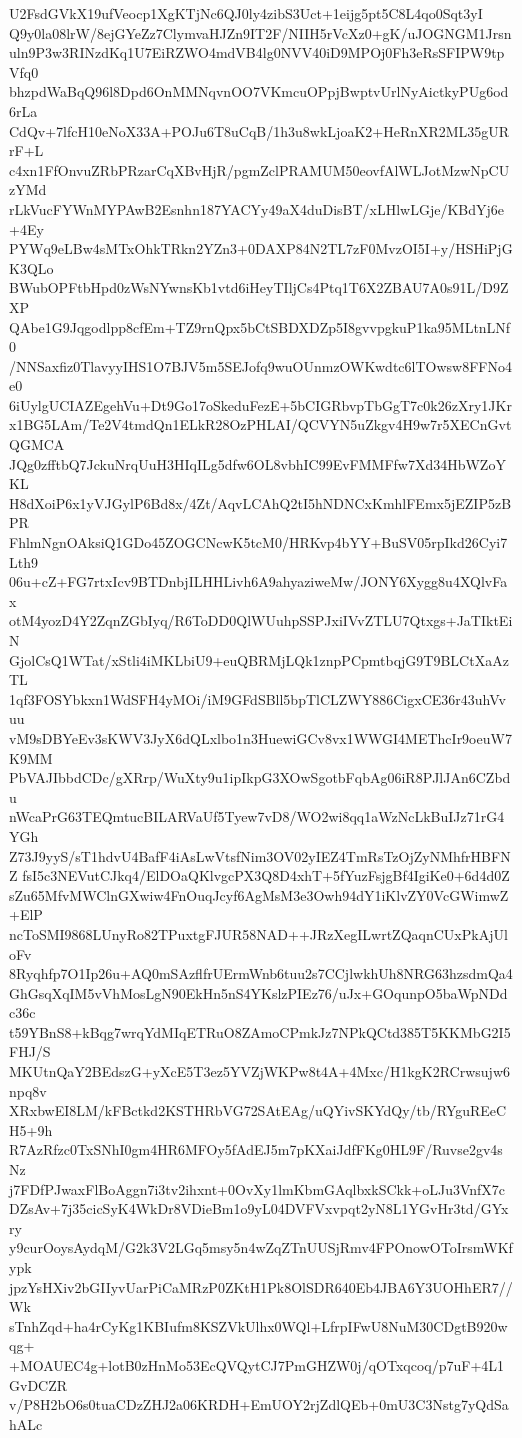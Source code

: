 U2FsdGVkX19ufVeocp1XgKTjNc6QJ0ly4zibS3Uct+1eijg5pt5C8L4qo0Sqt3yI
Q9y0la08lrW/8ejGYeZz7ClymvaHJZn9IT2F/NIIH5rVcXz0+gK/uJOGNGM1Jrsn
uln9P3w3RINzdKq1U7EiRZWO4mdVB4lg0NVV40iD9MPOj0Fh3eRsSFIPW9tpVfq0
bhzpdWaBqQ96l8Dpd6OnMMNqvnOO7VKmcuOPpjBwptvUrlNyAictkyPUg6od6rLa
CdQv+7lfcH10eNoX33A+POJu6T8uCqB/1h3u8wkLjoaK2+HeRnXR2ML35gURrF+L
c4xn1FfOnvuZRbPRzarCqXBvHjR/pgmZclPRAMUM50eovfAlWLJotMzwNpCUzYMd
rLkVucFYWnMYPAwB2Esnhn187YACYy49aX4duDisBT/xLHlwLGje/KBdYj6e+4Ey
PYWq9eLBw4sMTxOhkTRkn2YZn3+0DAXP84N2TL7zF0MvzOI5I+y/HSHiPjGK3QLo
BWubOPFtbHpd0zWsNYwnsKb1vtd6iHeyTIljCs4Ptq1T6X2ZBAU7A0s91L/D9ZXP
QAbe1G9Jqgodlpp8cfEm+TZ9rnQpx5bCtSBDXDZp5I8gvvpgkuP1ka95MLtnLNf0
/NNSaxfiz0TlavyyIHS1O7BJV5m5SEJofq9wuOUnmzOWKwdtc6lTOwsw8FFNo4e0
6iUylgUCIAZEgehVu+Dt9Go17oSkeduFezE+5bCIGRbvpTbGgT7c0k26zXry1JKr
x1BG5LAm/Te2V4tmdQn1ELkR28OzPHLAI/QCVYN5uZkgv4H9w7r5XECnGvtQGMCA
JQg0zfftbQ7JckuNrqUuH3HIqILg5dfw6OL8vbhIC99EvFMMFfw7Xd34HbWZoYKL
H8dXoiP6x1yVJGylP6Bd8x/4Zt/AqvLCAhQ2tI5hNDNCxKmhlFEmx5jEZIP5zBPR
FhlmNgnOAksiQ1GDo45ZOGCNcwK5tcM0/HRKvp4bYY+BuSV05rpIkd26Cyi7Lth9
06u+cZ+FG7rtxIcv9BTDnbjILHHLivh6A9ahyaziweMw/JONY6Xygg8u4XQlvFax
otM4yozD4Y2ZqnZGbIyq/R6ToDD0QlWUuhpSSPJxiIVvZTLU7Qtxgs+JaTIktEiN
GjolCsQ1WTat/xStli4iMKLbiU9+euQBRMjLQk1znpPCpmtbqjG9T9BLCtXaAzTL
1qf3FOSYbkxn1WdSFH4yMOi/iM9GFdSBll5bpTlCLZWY886CigxCE36r43uhVvuu
vM9sDBYeEv3sKWV3JyX6dQLxlbo1n3HuewiGCv8vx1WWGI4METhcIr9oeuW7K9MM
PbVAJIbbdCDc/gXRrp/WuXty9u1ipIkpG3XOwSgotbFqbAg06iR8PJlJAn6CZbdu
nWcaPrG63TEQmtucBILARVaUf5Tyew7vD8/WO2wi8qq1aWzNcLkBuIJz71rG4YGh
Z73J9yyS/sT1hdvU4BafF4iAsLwVtsfNim3OV02yIEZ4TmRsTzOjZyNMhfrHBFNZ
fsI5c3NEVutCJkq4/ElDOaQKlvgcPX3Q8D4xhT+5fYuzFsjgBf4IgiKe0+6d4d0Z
sZu65MfvMWClnGXwiw4FnOuqJcyf6AgMsM3e3Owh94dY1iKlvZY0VcGWimwZ+ElP
ncToSMI9868LUnyRo82TPuxtgFJUR58NAD++JRzXegILwrtZQaqnCUxPkAjUloFv
8Ryqhfp7O1Ip26u+AQ0mSAzflfrUErmWnb6tuu2s7CCjlwkhUh8NRG63hzsdmQa4
GhGsqXqIM5vVhMosLgN90EkHn5nS4YKslzPIEz76/uJx+GOqunpO5baWpNDdc36c
t59YBnS8+kBqg7wrqYdMIqETRuO8ZAmoCPmkJz7NPkQCtd385T5KKMbG2I5FHJ/S
MKUtnQaY2BEdszG+yXcE5T3ez5YVZjWKPw8t4A+4Mxc/H1kgK2RCrwsujw6npq8v
XRxbwEI8LM/kFBctkd2KSTHRbVG72SAtEAg/uQYivSKYdQy/tb/RYguREeCH5+9h
R7AzRfzc0TxSNhI0gm4HR6MFOy5fAdEJ5m7pKXaiJdfFKg0HL9F/Ruvse2gv4sNz
j7FDfPJwaxFlBoAggn7i3tv2ihxnt+0OvXy1lmKbmGAqlbxkSCkk+oLJu3VnfX7c
DZsAv+7j35cicSyK4WkDr8VDieBm1o9yL04DVFVxvpqt2yN8L1YGvHr3td/GYxry
y9curOoysAydqM/G2k3V2LGq5msy5n4wZqZTnUUSjRmv4FPOnowOToIrsmWKfypk
jpzYsHXiv2bGIIyvUarPiCaMRzP0ZKtH1Pk8OlSDR640Eb4JBA6Y3UOHhER7//Wk
sTnhZqd+ha4rCyKg1KBIufm8KSZVkUlhx0WQl+LfrpIFwU8NuM30CDgtB920wqg+
+MOAUEC4g+lotB0zHnMo53EcQVQytCJ7PmGHZW0j/qOTxqcoq/p7uF+4L1GvDCZR
v/P8H2bO6s0tuaCDzZHJ2a06KRDH+EmUOY2rjZdlQEb+0mU3C3Nstg7yQdSahALc
